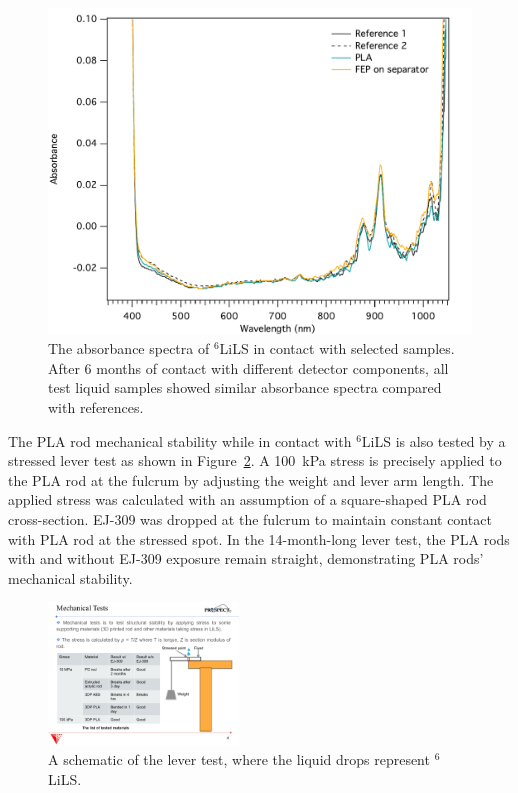 \begin{figure}[h!]
\centering
\includegraphics[width=.7\textwidth]{Figures/Fig28_a.pdf}
\caption[Optical grid compatibility]{The absorbance spectra of $^{6}$LiLS in contact with selected samples. 
After 6 months of contact with different detector components, all test liquid samples showed similar absorbance spectra compared with references.}
\label{fig:compat}
\end{figure}

The PLA rod mechanical stability while in contact with $^6$LiLS is also tested by a stressed lever test as shown in Figure~\ref{fig:leverPic}.
A 100~kPa stress is precisely applied to the PLA rod at the fulcrum by adjusting the weight and lever arm length.
The applied stress was calculated with an assumption of a square-shaped PLA rod cross-section.
EJ-309 was dropped at the fulcrum to maintain constant contact with PLA rod at the stressed spot.
In the 14-month-long lever test, the PLA rods with and without EJ-309 exposure remain straight, demonstrating PLA rods' mechanical stability.

\begin{figure}[h!]
\centering
\includegraphics[width=0.45\textwidth]{Figures/StressScheme.pdf}
\caption[A schematic of PLA rod lever test]{A schematic of the lever test, where the liquid drops represent $^{6}$LiLS.}
\label{fig:leverPic}
\end{figure}

